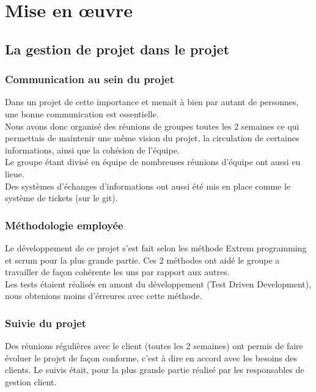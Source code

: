 \chapter{Mise en œuvre}

\section{La gestion de projet dans le projet}

\subsection{Communication au sein du projet}

Dans un projet de cette importance et menait à bien par autant de personnes, une bonne communication est essentielle.\\
Nous avons donc organisé des réunions de groupes toutes les 2 semaines ce qui permettais de maintenir une même vision du projet, la circulation de certaines informations, ainsi que la cohésion de l'équipe.\\
Le groupe étant divisé en équipe de nombreuses réunions d'équipe ont aussi eu lieue.\\
Des systèmes d'échanges d'informations ont aussi été mis en place comme le système de tickets (sur le git).\\

\subsection{Méthodologie employée}

Le développement de ce projet s'est fait selon les méthode Extrem programming et scrum pour la plus grande partie. Ces 2 méthodes ont aidé le groupe a travailler de façon cohérente les uns par rapport aux autres.\\

Les tests étaient réalisés en amont du développement (Test Driven Development), nous obtenions moins d'érreures avec cette méthode.\\

\subsection{Suivie du projet}
Des réunions régulières avec le client (toutes les 2 semaines) ont permis de faire évoluer le projet de façon conforme, c'est à dire en accord avec les besoins des clients. 
Le suivis était, pour la plus grande partie réalisé par les responsables de gestion client.\\

